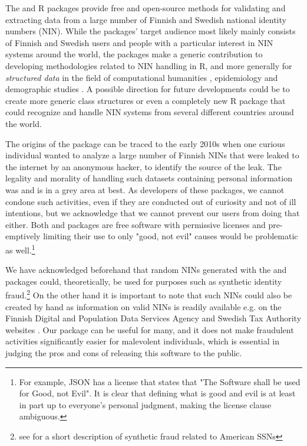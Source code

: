The  and  R packages provide free and open-source methods for validating and extracting data from a large number of Finnish and Swedish national identity numbers (NIN). While the packages' target audience most likely mainly consists of Finnish and Swedish users and people with a particular interest in NIN systems around the world, the packages make a generic contribution to developing methodologies related to NIN handling in R, and more generally for {\it structured data} in the field of computational humanities \citep[see][]{makela2020}, epidemiology and demographic studies \citep[see][]{gissler2004}. A possible direction for future developments could be to create more generic class structures or even a completely new R package that could recognize and handle NIN systems from several different countries around the world.

The origins of the  package can be traced to the early 2010s when one curious individual wanted to analyze a large number of Finnish NINs that were leaked to the internet by an anonymous hacker, to identify the source of the leak. The legality and morality of handling such datasets containing personal information was and is in a grey area at best. As developers of these packages, we cannot condone such activities, even if they are conducted out of curiosity and not of ill intentions, but we acknowledge that we cannot prevent our users from doing that either. Both  and  packages are free software with permissive licenses and pre-emptively limiting their use to only "good, not evil" causes would be problematic as well.\footnote{For example, JSON has a license that states that "The Software shall be used for Good, not Evil". It is clear that defining what is good and evil is at least in part up to everyone's personal judgment, making the license clause ambiguous.}

We have acknowledged beforehand that random NINs generated with the  and  packages could, theoretically, be used for purposes such as synthetic identity fraud.\footnote{see \citet[32]{brensinger2021} for a short description of synthetic fraud related to American SSNs} On the other hand it is important to note that such NINs could also be created by hand as information on valid NINs is readily available e.g. on the Finnish Digital and Population Data Services Agency and Swedish Tax Authority websites \citep{hetudvv, sv2007}. Our package can be useful for many, and it does not make fraudulent activities significantly easier for malevolent individuals, which is essential in judging the pros and cons of releasing this software to the public.


